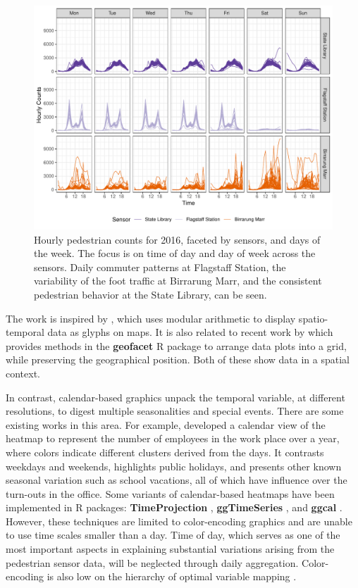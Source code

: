 \documentclass[12pt]{article}
\begin{document}
\begin{figure}

{\centering \includegraphics[width=\textwidth]{figure/facet-time-1} 

}

\caption{Hourly pedestrian counts for 2016, faceted by sensors, and days of the week. The focus is on time of day and day of week across the sensors. Daily commuter patterns at Flagstaff Station, the variability of the foot traffic at Birrarung Marr, and the consistent pedestrian behavior at the State Library, can be seen.}\label{fig:facet-time}
\end{figure}



The work is inspired by \citet{Wickham2012glyph}, which uses modular arithmetic to display spatio-temporal data as glyphs on maps. It is also related to recent work by \citet{R-geofacet} which provides methods in the \textbf{geofacet} R package to arrange data plots into a grid, while preserving the geographical position. Both of these show data in a spatial context.

In contrast, calendar-based graphics unpack the temporal variable, at different resolutions, to digest multiple seasonalities and special events. There are some existing works in this area. For example, \citet{VanWijkCluster1999} developed a calendar view of the heatmap to represent the number of employees in the work place over a year, where colors indicate different clusters derived from the days. It contrasts weekdays and weekends, highlights public holidays, and presents other known seasonal variation such as school vacations, all of which have influence over the turn-outs in the office. Some variants of calendar-based heatmaps have been implemented in R packages: \textbf{TimeProjection} \citep{R-TimeProjection}, \textbf{ggTimeSeries} \citep{R-ggTimeSeries}, and \textbf{ggcal} \citep{R-ggcal}. However, these techniques are limited to color-encoding graphics and are unable to use time scales smaller than a day. Time of day, which serves as one of the most important aspects in explaining substantial variations arising from the pedestrian sensor data, will be neglected through daily aggregation. Color-encoding is also low on the hierarchy of optimal variable mapping \citep{cleveland1984graphical, lam2007overview}.
\end{document}
